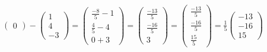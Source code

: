 \begin{enumerate}
\begin{math}
\begin{pmatrix}
                0
            \end{pmatrix}-\begin{pmatrix}
                1\\
                4\\
                -3
            \end{pmatrix}
            =\begin{pmatrix}
                \frac{-8}{5}-1\\
                \frac{4}{5}-4\\
                0+3
            \end{pmatrix}
            =\begin{pmatrix}
                \frac{-13}{5}\\
                \frac{-16}{5}\\
                3
            \end{pmatrix}
            =\begin{pmatrix}
                \frac{-13}{5}\\
                \frac{-16}{5}\\
                \frac{15}{5}
            \end{pmatrix}
            =\frac{1}{5}\begin{pmatrix}
                -13\\
                -16\\
                15
            \end{pmatrix}
        \end{math}
\end{enumerate}